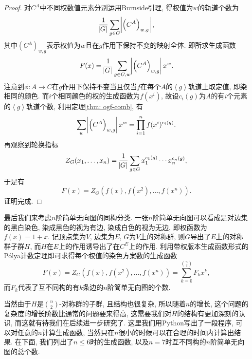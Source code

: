 \documentclass[chinese]{assignment}[2019/10/15]
\newcommand{\lr}[3]{\left#1#3\right#2}
\theoremstyle{plain}
\newcommand{\Polya}{P\'{o}lya}
\begin{document}
    \begin{proof}
        对$C^A$中不同权数值元素分别运用Burnside引理, 得权值为$w$的轨道个数为
        \begin{equation}
            \frac{1}{\abs{G}}\sum_{g\in G}\abs{\left(C^A\right)_{w, g}},
        \end{equation}
        其中$\left(C^A\right)_{w, g}$表示权值为$w$且在$g$作用下保持不变的映射全体. 即所求生成函数
        \begin{equation}
            F(x) = \frac{1}{\abs{G}}\sum_{g\in G, w}\abs{\lr(){C^A}_{w, g}}x^w.
        \end{equation}
        注意到$\phi: A\to C$在$g$作用下保持不变当且仅当$f$在每个$A$的$\lr<>g$轨道上取定值, 即染相同的颜色. 而$i$个相同颜色的权的生成函数为$f(x^i)$, 故设$c_i(g)$为$A$的有$i$个元素的$\lr<>g$轨道个数, 利用定理\ref{thm: ogf-comb}, 有
        \begin{equation}
            \sum_{w}\abs{\lr(){C^A}_{w, g}}x^w = \prod_{i=1}^n f(x^i)^{c_i(g)}.
        \end{equation}
        再观察到轮换指标
        \begin{equation}
            Z_G(x_1, \dotsc, x_n) = \frac{1}{\abs{G}}\sum_{g\in G}x_1^{c_1(g)}\dotsb x_n^{c_n(g)},
        \end{equation}
        于是有
        \begin{equation}
            F(x) = Z_G\left(f(x), f(x^2), \dotsc, f(x^n)\right).
        \end{equation}
        证明完成.
    \end{proof}

    最后我们来考虑$n$阶简单无向图的同构分类. 一张$n$阶简单无向图可以看成是对边集的黑白染色, 染成黑色的视为有边, 染成白色的视为无边, 即权函数为$f(x)=1+x$. 记顶点集为$V$, 边集为$E$, $G$为$V$上的对称群, 则$G$导出了$E$上的对称群子群$H$, 而$H$在$E$上的作用诱导出了在$C^E$上的作用. 利用带权版本生成函数形式的\Polya 计数定理即可求得每个权值的染色方案数的生成函数
    \begin{equation}
        F(x) = Z_G(f(x), f(x^2), \dotsc, f(x^n)) = \sum_{k=0}^{\binom n2}F_kx^k,
    \end{equation}
    而$F_k$代表了互不同构的有$k$条边的$n$阶简单无向图的个数.

    当然由于$H$是$\binom n2$-对称群的子群, 且结构也很复杂, 所以随着$n$的增长, 这个问题的复杂度的增长阶数比通常的问题要来得高, 这需要我们对$H$的结构有更加深刻的认识, 而这就有待我们在后续进一步研究了. 这里我们用Python写出了一段程序, 可以对任意的$n$计算生成函数, 当然只在$n$很小的时候可以在合理的时间内计算出结果. 在下面, 我们列出了$n\leq 6$时的生成函数, 以及$n=7$时互不同构的$n$阶简单无向图的总个数.
\end{document}
